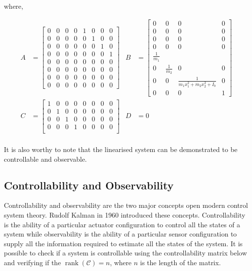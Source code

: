 \documentclass{UoNMCHA}
\numberwithin{equation}{section}
\begin{document}
	\newpage

	where,
	
	\begin{align*}
	A & = 
	\begin{bmatrix}
	0 & 0 & 0 & 0 & 1 & 0 & 0 & 0 \\
	0 & 0 & 0 & 0 & 0 & 1 & 0 & 0 \\
	0 & 0 & 0 & 0 & 0 & 0 & 1 & 0 \\
	0 & 0 & 0 & 0 & 0 & 0 & 0 & 1 \\
	0 & 0 & 0 & 0 & 0 & 0 & 0 & 0 \\
	0 & 0 & 0 & 0 & 0 & 0 & 0 & 0 \\
	0 & 0 & 0 & 0 & 0 & 0 & 0 & 0 \\
	0 & 0 & 0 & 0 & 0 & 0 & 0 & 0
	\end{bmatrix} & 
	B & = 
	\begin{bmatrix}
	0 & 0 & 0 & 0 \\
	0 & 0 & 0 & 0 \\
	0 & 0 & 0 & 0 \\
	0 & 0 & 0 & 0 \\
	\frac{1}{m_{1}} & & & \\
	0 & \frac{1}{m_{2}} & 0 & 0 \\
	0 & 0 & \frac{1}{m_1 x_1^2 + m_2 x_2^2 + I_b} & 0 \\
	0 & 0 & 0 & 1
	\end{bmatrix} \\
	C & = 
	\begin{bmatrix}
	1 & 0 & 0 & 0 & 0 & 0 & 0 & 0 \\
	0 & 1 & 0 & 0 & 0 & 0 & 0 & 0 \\
	0 & 0 & 1 & 0 & 0 & 0 & 0 & 0 \\
	0 & 0 & 0 & 1 & 0 & 0 & 0 & 0 \\
	\end{bmatrix} & 
	D & =0 \\
	\end{align*}
	
	
	It is also worthy to note that the linearised system can be demonstrated to be controllable and
	observable.
	
	\subsection{Controllability and Observability}
	Controllability and observability are the two major concepts open modern control system theory. Rudolf Kalman in 1960 introduced these concepts. Controllability is the ability of a particular actuator
	configuration to control all the states of a system while observability is the ability of a particular sensor
	configuration to supply all the information required to estimate all the states of the system. It is possible
	to check if a system is controllable using the controllability matrix below and verifying if the $\operatorname{rank}(\mathcal{C})=n$, where $n$ is the length of the matrix.
\end{document}
